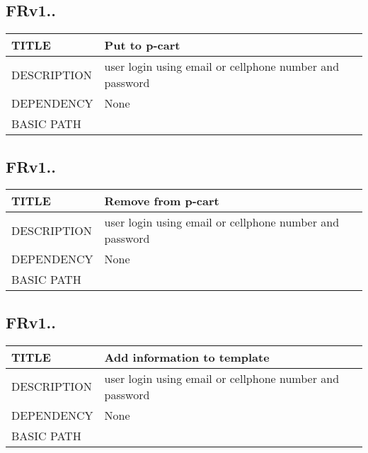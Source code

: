 \documentclass{scrreprt}
\begin{document}
\subsection{FRv1..}
\begin{table}[]
    \centering
    \begin{tabular}{|l|l|}
        \hline
         TITLE& Put to p-cart\\ \hline
         DESCRIPTION& user login using email or cellphone number and password   \\ \hline
         DEPENDENCY& None \\ \hline
         BASIC PATH&  \\ \hline
    \end{tabular}
\end{table}

\subsection{FRv1..}
\begin{table}[]
    \centering
    \begin{tabular}{|l|l|}
        \hline
         TITLE& Remove from p-cart\\ \hline
         DESCRIPTION& user login using email or cellphone number and password   \\ \hline
         DEPENDENCY& None \\ \hline
         BASIC PATH&  \\ \hline
    \end{tabular}
\end{table}

\subsection{FRv1..}
\begin{table}[]
    \centering
    \begin{tabular}{|l|l|}
        \hline
         TITLE& Add information to template\\ \hline
         DESCRIPTION& user login using email or cellphone number and password   \\ \hline
         DEPENDENCY& None \\ \hline
         BASIC PATH&  \\ \hline
    \end{tabular}
\end{table}
\end{document}

